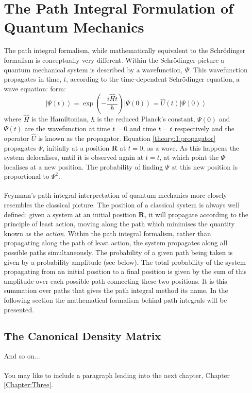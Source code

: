 \section{The Path Integral Formulation of Quantum     
Mechanics}\label{Chapter:theoryPIformalism}
The path integral formalism, while mathematically equivalent to the
Schr\"{o}dinger formalism is conceptually very
different.\cite{PIMCBerne1982,Tuckerman2010,Feynman2012} Within the
Schr\"{o}dinger picture a quantum mechanical system is described by a
wavefunction, $\Psi$.  This wavefunction propagates in time, $t$, according to 
the time-dependent Schr\"{o}dinger equation, a wave equation:
form:
\begin{equation}\label{theory:1:propagator}
\left | \Psi(t) \right> = \exp\left( -\frac{i\hat{H}t}{\hbar}\right) \left | 
\Psi(0) \right> = \hat{U}(t) \left | \Psi(0) \right>
\end{equation}
where $\hat{H}$ is the Hamiltonian, $\hbar$ is the reduced Planck's constant,
$\Psi(0)$ and $\Psi(t)$ are the wavefunction at time $t=0$ and time $t=t$
respectively and the operator $\hat{U}$ is known as the propagator.  Equation 
\ref{theory:1:propagator} propagates $\Psi$, 
initially at a position $\mathbf{R}$ at $t=0$, as a wave. As this happens the 
system delocalises, until it is observed again at $t=t$, at which point the 
$\Psi$ localises at a new position. The probability of finding $\Psi$ at this 
new position is proportional to $\Psi^2$.
\\\\
Feynman's path integral interpretation of quantum mechanics more closely 
resembles the classical picture.  The position of a classical system is always 
well defined: given a system at an initial position $\mathbf{R}$, it will 
propagate according to the principle of least action, moving along the path 
which minimises the quantity known as the 
\textit{action}.\cite{Goldstein2013} Within the
path integral formalism, rather than propagating along the path of least
action, the system propagates along all possible paths simultaneously.
The probability of a given path being taken is given by a probability 
amplitude (see below).  The total probability of the system propagating from an
initial position to a final position is given by the sum of this amplitude
over each possible path connecting these two positions. It is this summation
over paths that gives the path integral method its name.  In the following 
section the mathematical formalism behind path integrals will be presented.

\subsection{The Canonical Density Matrix}
And so on...
\\\\
You may like to include a paragraph leading into the next chapter, Chapter 
\ref{Chapter:Three}.

\newpage
